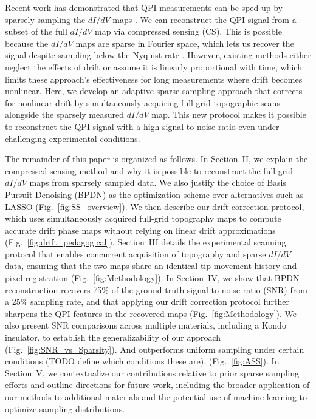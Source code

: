 \documentclass[amsmath,amssymb,superscriptaddress,longbibliography,prb,twocolumn,floatfix]{revtex4-2}
\newif\ifptitle
\newif\ifpnumber
\newcounter{para}
\newcommand\ptitle[1]{\par\refstepcounter{para}
{\ifpnumber{\noindent\textcolor{lightgray}{\textbf{\thepara}}\indent}\fi}
{\ifptitle{\textbf{[{#1}]}}\fi}}
\begin{document}
\ptitle{Motivate sparse sampling + compressed sensing as a solution to this problem} 
Recent work has demonstrated that QPI measurements can be sped up by sparsely sampling the \(dI/dV\) maps \cite{NakanishiOhnoJPSJ2016, OppligerPRR2020, OppligerMethodsX2022}. We can reconstruct the QPI signal from a subset of the full \(dI/dV\) map via compressed sensing (CS). This is possible because the \(dI/dV\) maps are sparse in Fourier space, which lets us recover the signal despite sampling below the Nyquist rate \cite{CandesIEEE2006}. However, existing methods either neglect the effects of drift or assume it is linearly proportional with time, which limits these approach's effectiveness for long measurements where drift becomes nonlinear. Here, we develop an adaptive sparse sampling approach that corrects for nonlinear drift by simultaneously acquiring full-grid topographic scans alongside the sparsely measured \(dI/dV\) map. This new protocol makes it possible to reconstruct the QPI signal with a high signal to noise ratio even under challenging experimental conditions.

\ptitle{Outline Paper}
The remainder of this paper is organized as follows. In Section~II, we explain the compressed sensing method and why it is possible to reconstruct the full-grid \(dI/dV\) maps from sparsely sampled data. We also justify the choice of Basis Pursuit Denoising (BPDN) as the optimization scheme over alternatives such as LASSO (Fig.~\ref{fig:SS_overview}). We then describe our drift correction protocol, which uses simultaneously acquired full-grid topography maps to compute accurate drift phase maps without relying on linear drift approximations (Fig.~\ref{fig:drift_pedagogical}). Section~III details the experimental scanning protocol that enables concurrent acquisition of topography and sparse \(dI/dV\) data, ensuring that the two maps share an identical tip movement history and pixel registration (Fig.~\ref{fig:Methodology}). In Section~IV, we show that BPDN reconstruction recovers 75\% of the ground truth signal-to-noise ratio (SNR) from a 25\% sampling rate, and that applying our drift correction protocol further sharpens the QPI features in the recovered maps (Fig.~\ref{fig:Methodology}). We also present SNR comparisons across multiple materials, including a Kondo insulator, to establish the generalizability of our approach (Fig.~\ref{fig:SNR_vs_Sparsity}). And outperforms uniform sampling under certain conditions (TODO define which conditions these are). (Fig.~\ref{fig:ASS}). In Section~V, we contextualize our contributions relative to prior sparse sampling efforts and outline directions for future work, including the broader application of our methods to additional materials and the potential use of machine learning to optimize sampling distributions.
\end{document}
